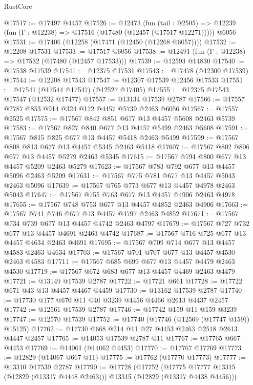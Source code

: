 \begin{lexlean}{RustCore}
\begin{coremodule}
@17517 := @17497 @4457
@17526 := @12473
    (fun (tail : @2505) => @12239 (fun (Γ : @12238) => @17516 (@17480 (@12457 (@17517 @12271)))))
    @6056
@17531 := @17406 (@12258 (@17471 (@12450 (@12268 @6057))))
@17532 := @12208 @17531
@17533 := @17517 @6056
@17538 := @12491 (fun (Γ : @12238) => @17532 (@17480 (@12457 @17533)))
@17539 := @12593 @14830
@17540 := @17538 @17539
@17541 := @12375 @17531
@17543 := @17478 (@12300 @17539)
@17544 := @12208 @17543
@17547 := @12307 @17539 @12456 @17533
@17551 := @17541 (@17544 @17547) (@12527 @17405)
@17555 := @12375 @17543 @17547 (@12532 @17477)
@17557 := @13134 @17539 @2787
@17566 := @17557 @2787 @853 @914 @324 @172 @4457 @5739 @2463 @6056
@17567 := @17557 @2525
@17575 := @17567 @842 @851 @677 @13 @4457 @5608 @2463 @5739
@17583 := @17567 @827 @840 @677 @13 @4457 @5499 @2463 @5608
@17591 := @17567 @815 @825 @677 @13 @4457 @5418 @2463 @5499
@17599 := @17567 @808 @813 @677 @13 @4457 @5345 @2463 @5418
@17607 := @17567 @802 @806 @677 @13 @4457 @5279 @2463 @5345
@17615 := @17567 @794 @800 @677 @13 @4457 @5209 @2463 @5279
@17623 := @17567 @783 @792 @677 @13 @4457 @5096 @2463 @5209
@17631 := @17567 @775 @781 @677 @13 @4457 @5043 @2463 @5096
@17639 := @17567 @765 @773 @677 @13 @4457 @4978 @2463 @5043
@17647 := @17567 @755 @763 @677 @13 @4457 @4906 @2463 @4978
@17655 := @17567 @748 @753 @677 @13 @4457 @4852 @2463 @4906
@17663 := @17567 @741 @746 @677 @13 @4457 @4797 @2463 @4852
@17671 := @17567 @734 @739 @677 @13 @4457 @4742 @2463 @4797
@17679 := @17567 @727 @732 @677 @13 @4457 @4691 @2463 @4742
@17687 := @17567 @716 @725 @677 @13 @4457 @4634 @2463 @4691
@17695 := @17567 @709 @714 @677 @13 @4457 @4583 @2463 @4634
@17703 := @17567 @701 @707 @677 @13 @4457 @4530 @2463 @4583
@17711 := @17567 @685 @699 @677 @13 @4457 @4479 @2463 @4530
@17719 := @17567 @672 @683 @677 @13 @4457 @4469 @2463 @4479
@17721 := @13149 @17539 @2787
@17722 := @17721 @661
@17728 := @17722 @671 @43 @13 @4457 @4467 @4459
@17730 := @13162 @17539 @2787
@17740 := @17730 @177 @670 @11 @40 @3239 @4456 @4466 @2613 @4437 @2457
@17742 := @12561 @17539 @2787
@17746 := @17742 @159 @11 @159 @3239
@17747 := @12570 @17539
@17752 := @17740 (@17746 (@12569 (@17747 @159)) @15125)
@17762 := @17730 @668 @214 @11 @27 @4453 @2463 @2518 @2613 @4447 @2457
@17765 := @14053 @17539 @2787 @11
@17767 := @17765 @667 @4453
@17769 := @14061 (@14062 @4453)
@17770 := @17767 @17769
@17773 := @12829 (@14067 @667 @11)
@17775 := @17762 (@17770 @17773)
@17777 := @13310 @17539 @2787
@17790 := @17728
    (@17752
      (@17775 @17777 @13315 (@12829 (@13317 @4448 @2463)))
      @13315
      (@12829 (@13317 @4438 @4456)))

\end{coremodule}
\end{lexlean}
